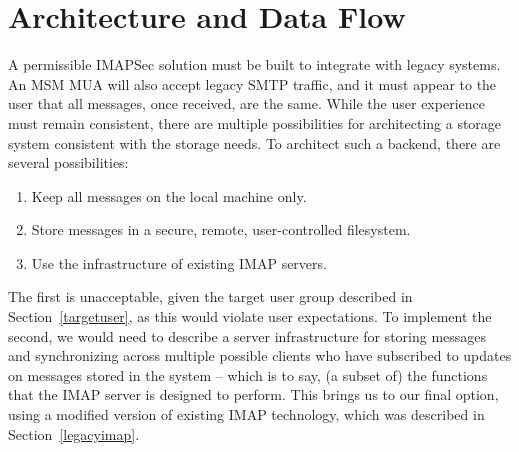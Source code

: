 \documentclass[pageno]{jpaper}
\newcommand{\project}{IMAPSec }
\begin{document}
\label{architecture}
\section{Architecture and Data Flow}

A permissible \project solution must be built to integrate with legacy systems. An MSM MUA will also accept legacy SMTP traffic, and it must appear to the user that all messages, once received, are the same. While the user experience must remain consistent, there are multiple possibilities for architecting a storage system consistent with the storage needs. To architect such a backend, there are several possibilities:

\begin{enumerate}
  \item Keep all messages on the local machine only.
    \item Store messages in a secure, remote, user-controlled filesystem.
    \item Use the infrastructure of existing IMAP servers.
\end{enumerate}

The first is unacceptable, given the target user group described in Section~\ref{targetuser}, as this would violate user expectations. To implement the second, we would need to describe a server infrastructure for storing messages and synchronizing across multiple possible clients who have subscribed to updates on messages stored in the system -- which is to say, (a subset of) the functions that the IMAP server is designed to perform. This brings us to our final option, using a modified version of existing IMAP technology, which was described in Section~\ref{legacyimap}.
\end{document}
